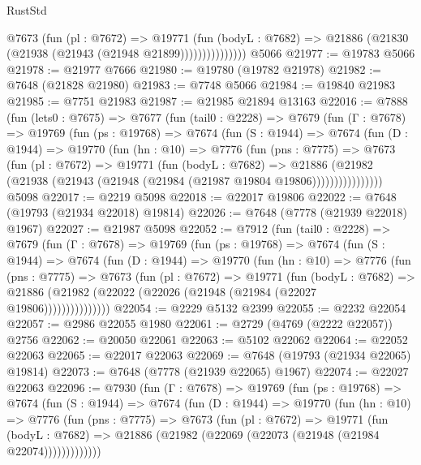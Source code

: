 \begin{lexlean}{RustStd}
\begin{coremodule}
                    @7673
                      (fun (pl : @7672) =>
                      @19771
                        (fun (bodyL : @7682) =>
                        @21886 (@21830 (@21938 (@21943 (@21948 @21899)))))))))))))))
    @5066
@21977 := @19783 @5066
@21978 := @21977 @7666
@21980 := @19780 (@19782 @21978)
@21982 := @7648 (@21828 @21980)
@21983 := @7748 @5066
@21984 := @19840 @21983
@21985 := @7751 @21983
@21987 := @21985 @21894 @13163
@22016 := @7888
    (fun (lets0 : @7675) =>
    @7677
      (fun (tail0 : @2228) =>
      @7679
        (fun (Γ : @7678) =>
        @19769
          (fun (ps : @19768) =>
          @7674
            (fun (S : @1944) =>
            @7674
              (fun (D : @1944) =>
              @19770
                (fun (hn : @10) =>
                @7776
                  (fun (pns : @7775) =>
                  @7673
                    (fun (pl : @7672) =>
                    @19771
                      (fun (bodyL : @7682) =>
                      @21886
                        (@21982
                          (@21938 (@21943 (@21948 (@21984 (@21987 @19804 @19806))))))))))))))))
    @5098
@22017 := @2219 @5098
@22018 := @22017 @19806
@22022 := @7648 (@19793 (@21934 @22018) @19814)
@22026 := @7648 (@7778 (@21939 @22018) @1967)
@22027 := @21987 @5098
@22052 := @7912
    (fun (tail0 : @2228) =>
    @7679
      (fun (Γ : @7678) =>
      @19769
        (fun (ps : @19768) =>
        @7674
          (fun (S : @1944) =>
          @7674
            (fun (D : @1944) =>
            @19770
              (fun (hn : @10) =>
              @7776
                (fun (pns : @7775) =>
                @7673
                  (fun (pl : @7672) =>
                  @19771
                    (fun (bodyL : @7682) =>
                    @21886 (@21982 (@22022 (@22026 (@21948 (@21984 (@22027 @19806)))))))))))))))
@22054 := @2229 @5132 @2399
@22055 := @2232 @22054
@22057 := @2986 @22055 @1980
@22061 := @2729 (@4769 (@2222 @22057)) @2756
@22062 := @20050 @22061
@22063 := @5102 @22062
@22064 := @22052 @22063
@22065 := @22017 @22063
@22069 := @7648 (@19793 (@21934 @22065) @19814)
@22073 := @7648 (@7778 (@21939 @22065) @1967)
@22074 := @22027 @22063
@22096 := @7930
    (fun (Γ : @7678) =>
    @19769
      (fun (ps : @19768) =>
      @7674
        (fun (S : @1944) =>
        @7674
          (fun (D : @1944) =>
          @19770
            (fun (hn : @10) =>
            @7776
              (fun (pns : @7775) =>
              @7673
                (fun (pl : @7672) =>
                @19771
                  (fun (bodyL : @7682) =>
                  @21886 (@21982 (@22069 (@22073 (@21948 (@21984 @22074)))))))))))))

\end{coremodule}
\end{lexlean}

